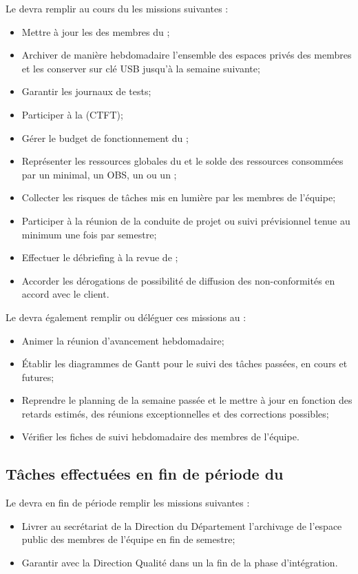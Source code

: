 Le \CP{} devra remplir au cours du \PICCourt les missions suivantes :

\begin{itemize}
	\item Mettre à jour les \FC{} des membres du \PICCourt;
	\item Archiver de manière hebdomadaire l’ensemble des espaces privés des membres et les conserver sur clé USB jusqu’à la semaine suivante;
	\item Garantir les journaux de tests;
	\item Participer à la \CTFT (CTFT);
	\item Gérer le budget de fonctionnement du \PICCourt;
	\item Représenter les ressources globales du \PICCourt et le solde des ressources consommées par un \WBSCourt minimal, un OBS, un \RBSCourt{} ou un \FBSCourt;

	\item Collecter les risques de tâches mis en lumière par les membres de l’équipe;
	\item Participer à la réunion de la conduite de projet ou suivi prévisionnel tenue au minimum une fois par semestre;
	\item Effectuer le débriefing à la revue de \PICCourt;
	\item Accorder les dérogations de possibilité de diffusion des non-conformités en accord avec le client.
\end{itemize}

Le \CP{} devra également remplir ou déléguer ces missions au \CPA :
\begin{itemize}
	\item Animer la réunion d’avancement hebdomadaire;
	\item Établir les diagrammes de Gantt pour le suivi des tâches passées, en cours et futures;
	\item Reprendre le planning de la semaine passée et le mettre à jour en fonction des retards estimés, des réunions exceptionnelles et des corrections possibles;
	\item Vérifier les fiches de suivi hebdomadaire des membres de l’équipe.
\end{itemize}

\subsection*{Tâches effectuées en fin de période du \PICCourt}

Le \CP{} devra en fin de période remplir les missions suivantes :
\begin{itemize}
	\item Livrer au secrétariat de la Direction du Département \ASICourt{} l’archivage de l’espace public des membres de l’équipe en fin de semestre;
	\item Garantir avec la Direction Qualité dans un \PVCourt{} la fin de la phase d’intégration.
\end{itemize}